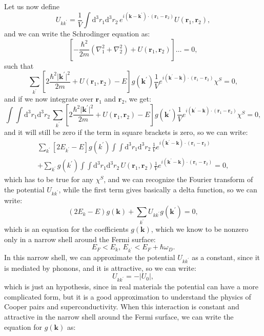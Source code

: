 Let us now define
\[
    U_{k k^{\prime}} = \frac{1}{V} \int \mathrm{d}^3 r_1 \mathrm{d}^3 r_2 \, e^{i (\mathbf{k} - \mathbf{k}^{\prime}) \cdot (\mathbf{r}_1 - \mathbf{r}_2)} U(\mathbf{r}_1, \mathbf{r}_2),
\]
and we can write the Schrodinger equation as:
\[
    \left[ - \frac{\hbar^2}{2m} (\nabla_1^2 + \nabla_2^2) + U(\mathbf{r}_1, \mathbf{r}_2) \right] \dots = 0,
\]
such that
\[
    \sum_{k^{\prime}} \left[ 2 \frac{\hbar^2 \vert \mathbf{k}^{\prime} \vert^2 }{2m} + U(\mathbf{r}_1, \mathbf{r}_2) - E\right] g(\mathbf{k}^{\prime}) \frac{1}{V} e^{i(\mathbf{k}^{\prime}- \mathbf{k}) \cdot (\mathbf{r}_1 - \mathbf{r}_2)} \chi^S = 0,
\]
and if we now integrate over \(\mathbf{r}_1\) and \(\mathbf{r}_2\), we get:
\[
    \int \int \mathrm{d}^3 r_1 \mathrm{d}^3 r_2 \, \sum_{k^{\prime}} \left[ 2 \frac{\hbar^2 \vert \mathbf{k}^{\prime} \vert^2 }{2m} + U(\mathbf{r}_1, \mathbf{r}_2) - E\right] g(\mathbf{k}^{\prime}) \frac{1}{V} e^{i(\mathbf{k}^{\prime}- \mathbf{k}) \cdot (\mathbf{r}_1 - \mathbf{r}_2)} \chi^S = 0,
\]
and it will still be zero if the term in square brackets is zero, so we can write:
\[
    \begin{aligned}
        \sum_{k^{\prime}} \left[ 2 E_{k^{\prime}} - E \right] g(k^{\prime}) \int \int \mathrm{d}^3 r_1 \mathrm{d}^3 r_2 \, \frac{1}{V} e^{i(\mathbf{k}^{\prime}- \mathbf{k}) \cdot (\mathbf{r}_1 - \mathbf{r}_2)} \\
        + \sum_{k^{\prime}} g(k^{\prime}) \int \int \mathrm{d}^3 r_1 \mathrm{d}^3 r_2 \, U(\mathbf{r}_1, \mathbf{r}_2) \frac{1}{V} e^{i(\mathbf{k}^{\prime}- \mathbf{k}) \cdot (\mathbf{r}_1 - \mathbf{r}_2)} = 0,
    \end{aligned}
\]
which has to be true for any \(\chi^S\), and we can recognize the Fourier transform of the potential \(U_{k k^{\prime}}\), while the first term gives basically a delta function, so we can write:
\[
    (2 E_k - E)g(\mathbf{k}) + \sum_{k^{\prime}} U_{k k^{\prime}} g(\mathbf{k}^{\prime}) = 0,
\]
which is an equation for the coefficients \(g(\mathbf{k})\), which we know to be nonzero only in a narrow shell around the Fermi surface:
\[
    E_F < E_k,\,E_{k^{\prime}} < E_F + \hbar \omega_D.
\]
In this narrow shell, we can approximate the potential \(U_{k k^{\prime}}\) as a constant, since it is mediated by phonons, and it is attractive, so we can write:
\[
    U_{k k^{\prime}} = - \vert U_0 \vert,
\]
which is just an hypothesis, since in real materials the potential can have a more complicated form, but it is a good approximation to understand the physics of Cooper pairs and superconductivity. When this interaction is constant and attractive in the narrow shell around the Fermi surface, we can write the equation for \(g(\mathbf{k})\) as:
